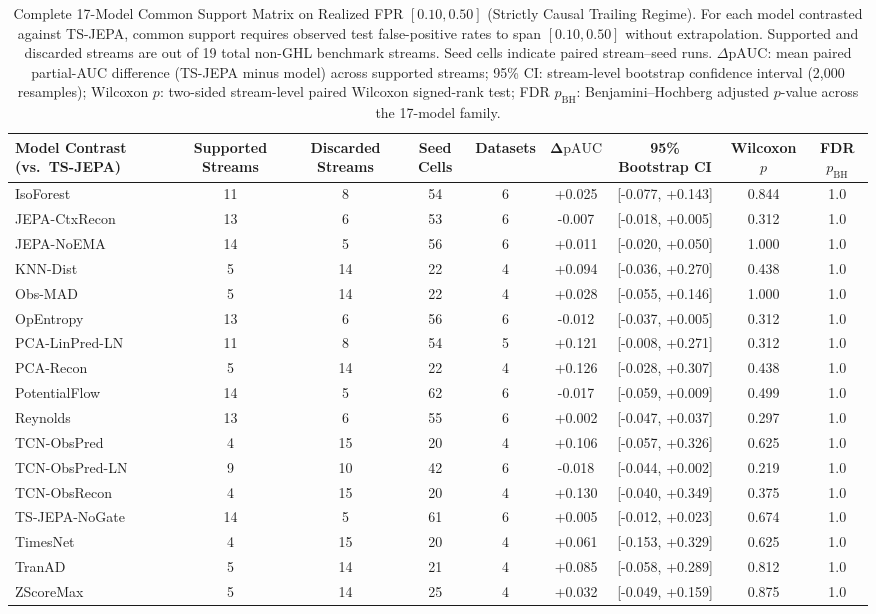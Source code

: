 \begin{table}[t]
\centering
\scriptsize
\caption{Complete 17-Model Common Support Matrix on Realized FPR $[0.10, 0.50]$ (Strictly Causal Trailing Regime). For each model contrasted against TS-JEPA, common support requires observed test false-positive rates to span $[0.10, 0.50]$ without extrapolation. Supported and discarded streams are out of 19 total non-GHL benchmark streams. Seed cells indicate paired stream--seed runs. $\Delta\mathrm{pAUC}$: mean paired partial-AUC difference (TS-JEPA minus model) across supported streams; 95\% CI: stream-level bootstrap confidence interval (2,000 resamples); Wilcoxon $p$: two-sided stream-level paired Wilcoxon signed-rank test; FDR $p_{\mathrm{BH}}$: Benjamini--Hochberg adjusted $p$-value across the 17-model family.}\label{tab:common_support_17models}
\begin{tabular}{@{}lcccccccc@{}}
\toprule
\textbf{Model Contrast (vs.\ TS-JEPA)} & \textbf{Supported Streams} & \textbf{Discarded Streams} & \textbf{Seed Cells} & \textbf{Datasets} & $\mathbf{\Delta\mathrm{pAUC}}$ & \textbf{95\% Bootstrap CI} & \textbf{Wilcoxon} $p$ & \textbf{FDR} $p_{\mathrm{BH}}$ \\
\midrule
IsoForest & 11 & 8 & 54 & 6 & +0.025 & [-0.077, +0.143] & 0.844 & 1.0 \\
JEPA-CtxRecon & 13 & 6 & 53 & 6 & -0.007 & [-0.018, +0.005] & 0.312 & 1.0 \\
JEPA-NoEMA & 14 & 5 & 56 & 6 & +0.011 & [-0.020, +0.050] & 1.000 & 1.0 \\
KNN-Dist & 5 & 14 & 22 & 4 & +0.094 & [-0.036, +0.270] & 0.438 & 1.0 \\
Obs-MAD & 5 & 14 & 22 & 4 & +0.028 & [-0.055, +0.146] & 1.000 & 1.0 \\
OpEntropy & 13 & 6 & 56 & 6 & -0.012 & [-0.037, +0.005] & 0.312 & 1.0 \\
PCA-LinPred-LN & 11 & 8 & 54 & 5 & +0.121 & [-0.008, +0.271] & 0.312 & 1.0 \\
PCA-Recon & 5 & 14 & 22 & 4 & +0.126 & [-0.028, +0.307] & 0.438 & 1.0 \\
PotentialFlow & 14 & 5 & 62 & 6 & -0.017 & [-0.059, +0.009] & 0.499 & 1.0 \\
Reynolds & 13 & 6 & 55 & 6 & +0.002 & [-0.047, +0.037] & 0.297 & 1.0 \\
TCN-ObsPred & 4 & 15 & 20 & 4 & +0.106 & [-0.057, +0.326] & 0.625 & 1.0 \\
TCN-ObsPred-LN & 9 & 10 & 42 & 6 & -0.018 & [-0.044, +0.002] & 0.219 & 1.0 \\
TCN-ObsRecon & 4 & 15 & 20 & 4 & +0.130 & [-0.040, +0.349] & 0.375 & 1.0 \\
TS-JEPA-NoGate & 14 & 5 & 61 & 6 & +0.005 & [-0.012, +0.023] & 0.674 & 1.0 \\
TimesNet & 4 & 15 & 20 & 4 & +0.061 & [-0.153, +0.329] & 0.625 & 1.0 \\
TranAD & 5 & 14 & 21 & 4 & +0.085 & [-0.058, +0.289] & 0.812 & 1.0 \\
ZScoreMax & 5 & 14 & 25 & 4 & +0.032 & [-0.049, +0.159] & 0.875 & 1.0 \\
\bottomrule
\end{tabular}
\end{table}
